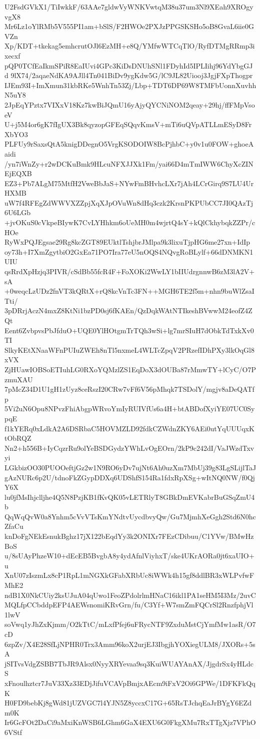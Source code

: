 U2FsdGVkX1/TiIwkkF/63AAe7gldwVyWNKVwtqM38u37um3Nl9XEah9XROgyvgX8
Mr6Lz1oYlRMb5V555PI1am+bSlS/F2HWOe2PXJzPPGSKSHo5oB8GvaL6iie0GVZn
Xp/KDT+tkekag5emhcrutOJl6EzMH+e8Q/YMfwWTCqTlO/RyfDTMgRRmp3ixecxf
pQP0TCfEaIkmSPiR8EaIUvi4GPc3KiDsDNUhSNl1FDyhId5IPLIihj96YdYbgGJd
9lX74/2aqaeNdKA9AJll4Tn041BiDv9ygKdw5G/lC9JL82Uiooj3JgjFXpThogpr
IJEm93I+ImXmun31kbRKe5WnhTn53Zj/Lbp+TDT6DP69W8TMFbUonnXuvhhN5uY8
2JpEqYPztx7VIXxV18Kz7kwBiJQmU16yAjyQYCNiNOM2qeay+29hj/ffFMpVsoeV
U+j5M4or6gK7fIgUX3Bk8qyzopGFEqSQqvKmsV+mTi6uQVpATLLmESyD8FrXbYO3
PLFUy9rSaxsQtA5knigDDegnO5VrgKSODOIW8BcPjhbC+y0v1u0FOW+ghoeAaidi
/yn7iWnZy+r2wDCKuBmk9HLcuNFXJJXk1Fm/yai66D4mTmIWW6ChyXcZINEjEQXB
EZ3+Pb7ALgM75MtfH2VweBbJaS+NYwFmBHvhcLXr7jAh4LCrGirq9S7LU4UrHXMB
uW7f4RFEgZdWWVXZZpjXqXJpOVuWn8dHq3czk2KrsnPKPUbCC7JI0QAzTj6U6LGb
+jvOKuS0cVkpeBIywK7CvLYHhkm6oUeMH0m4wjrtQ4sY+kQlCkhybqkZZPr/cHOe
RyWxPQJEgsae29Rg8kcZGT89EUktlTshjbrJMlpa9k3lixuTjpHG6me27xn+IdIp
oy73h+I7XmZgytbiO2GxEa71PO7Ira77eU5nOQS4NQvgRoBLylf+66dDNMKN1UIU
qsRrdXpHzjq3PIVR/cSdBb55fcR4F+FoXOKi2WwLY1bIIUdrgnnwB6zM3lA2V+sA
+0weqcLzUDz2fnVT3kQRtX+rQ8kcVnTc3FN++MGH6TE2f5m+nhn9buWlZsaITti/
3pDRrjAczN4mxZ8KtNi1bzPD0sj6fKAEn/QzDqkWAtNTIkeshBVwwM24eofZ4ZQt
Eent6ZvbpvsPbJfduO+UQE0YlHOtgmTrTQh3wSi+lg7mrSIuH7dObkTdTxkXv0TI
SlkyKEtXNaaWFnPUIuZWEh8nTl5nxmeL4WLTcZpqV2PRzefIDhPXy3lkOqGl8xVX
ZjHUawIOBSoETIuhLG0RXoYQMzlZS1EqDoX3dOUBa87rMmwTY+lCyC/O7PzmuXAU
7pMcZ34D1U1gH1zUyz8ceRszI20CRw7vFf6V56pMhqk7TSDolY/mgjv8aDeQATfp
5Vi2uN6Opu8NPvzFhiAbgpWRvoYmIyRUIVfUs6a4H+btABDofXyiYE07UC0SypqE
f1kYERq0xLdkA2A6DSRbaC5HOVMZLD92fdkCZWdnZKY6AEi0utYqUUUqxKtObRQZ
Nn2+h556B+IyCqzrRu9olYeBSDGydzYWhLvOgEOrn/2kP9c242dI/VaJWzdTxvyi
LGkbizOO30PUOOeftjGz2w1N9RO6yDv7ujNt6Ah0uzXm7MbUj39g83LgSLijlTaJ
gAzNURc6p2U/tdnoFkZGypDDXq6UDShfS154Ra1fdxRpXSg+wItNQ0NW/f0QjY6X
lu0jfMsIhjclljhe4Q5N8PzjKB1fKvQK05vLETRlyT8GBkDmEVKabrBuGSqZmU4b
QqWqQvW0a8Ynhm5cVvVTsKmYNdtvUycdbvyQw/Gu7MjmhXeGgh2Std6N0hcZfaCu
knDoFgNEkEsnukBghz17jX122bEqdYy3k2ONIXr7FEzCDibuu/C1YVw/BMwHzBoS
u/8sUAyPhzeW10+dEcEB5BvgbA8y4ydAfnlViyhxT/ske4UKrAORa0jt6xaUIO+u
XnU07zIszmLx8cP1RpL1mNGXkGFabXRbUc8iWWk4h15gf8ddlBR3xWLPvfwFMhE2
ndB1X0NkCUiy2ksUJuA04qUwo1FeoZPdolrlmHNaC16ikl1PA1seHM5I3Mz/2uvC
MQLfpCCbddpEFP4AEWsnomiKRvGrn/fu/C3Yf+W7smZmFQCrSl2RnzfphjVl1lwV
soVwq1yJhZxKjmm/O2kTtC/mLxfPfej6uFRycNTF9ZxduMstCjYmfMw1asR/O7cD
6zpZv/X4E28SfLjNPHR0Trx3Amm96koX2urjEJ3IbgjhYOXiegULM8/JXORs+5sA
jSITvsVdgZSBB7TbJR9Alsx0NyyXRYevaa9sq3KuiWUAYAnAX/JjgdrSx4yHLdcS
xFnoulhztcr7JuV33Xz33EDjJifuVCAVpBmjxAEcm9iFxV2Oi6GPWe/1DFKFkQqK
H0FD9bebKj8gWd81jUZVGC7l4YJN5Z8yccxC17G+65RsTJchqEaJrBYgY6EZdm0K
Ir6GcFOt2DaCi9aMxiKnWSB6LGhm6GaX4EXU6G0FkgXMu7RxTTgXjz7VPhO6VStf
